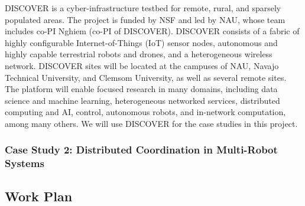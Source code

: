 DISCOVER %
is a cyber-infrastructure testbed for remote, rural, and sparsely populated areas.
The project is funded by NSF and led by NAU, whose team includes co-PI Nghiem (co-PI of DISCOVER).
DISCOVER consists of a fabric of highly configurable Internet-of-Things (IoT) sensor nodes, autonomous and highly capable terrestrial robots and drones, and a heterogeneous wireless network.
DISCOVER sites will be located at the campuses of NAU, Navajo Technical University, and Clemsom University, as well as several remote sites.
The platform will enable focused research in many domains, including data science and machine learning, heterogeneous networked services, distributed computing and AI, control, autonomous robots, and in-network computation, among many others.
%
We will use DISCOVER for the case studies in this project.



\subsubsection{Case Study 2: Distributed Coordination in Multi-Robot Systems}
\label{sec:case-study-robots}



\subsection{Work Plan}
\label{sec:workplan}


% 


